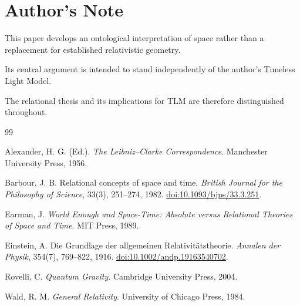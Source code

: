 \documentclass[12pt,onecolumn]{article}
\begin{document}
\section*{Author's Note}

This paper develops an
ontological interpretation
of space rather than a
replacement for established
relativistic geometry.

Its central argument is
intended to stand independently
of the author's Timeless
Light Model.

The relational thesis
and its implications for
TLM are therefore
distinguished throughout.

\begin{thebibliography}{99}

Alexander, H. G. (Ed.).
\emph{The Leibniz--Clarke Correspondence}.
Manchester University Press, 1956.

Barbour, J. B.
Relational concepts of space and time.
\emph{British Journal for the Philosophy
of Science}, 33(3), 251--274, 1982.
\href{https://doi.org/10.1093/bjps/33.3.251}
{doi:10.1093/bjps/33.3.251}.

Earman, J.
\emph{World Enough and Space-Time:
Absolute versus Relational Theories
of Space and Time}.
MIT Press, 1989.

Einstein, A.
Die Grundlage der allgemeinen
Relativit\"atstheorie.
\emph{Annalen der Physik},
354(7), 769--822, 1916.
\href{https://doi.org/10.1002/andp.19163540702}
{doi:10.1002/andp.19163540702}.

Rovelli, C.
\emph{Quantum Gravity}.
Cambridge University Press, 2004.

Wald, R. M.
\emph{General Relativity}.
University of Chicago Press, 1984.

\end{thebibliography}
\end{document}
